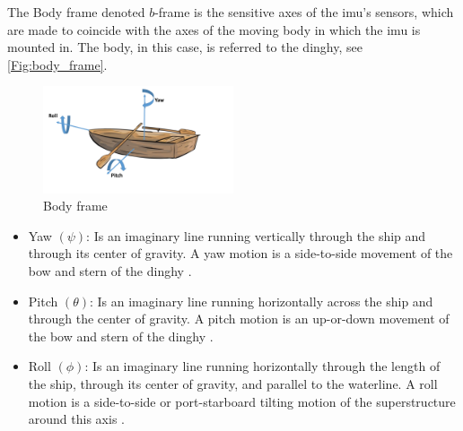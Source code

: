 The Body frame denoted $b$-frame is the sensitive axes of the \gls{imu}'s sensors, which are made to coincide with the axes of the moving body in which the \gls{imu} is mounted in. The body, in this case, is referred to the dinghy, see \autoref{Fig:body_frame}.

\begin{figure}[H]
\centering
\includegraphics[width=0.5\textwidth]{Figures/Euler_angle.pdf}
\caption{Body frame}
\label{Fig:body_frame}
\end{figure}
\begin{itemize}
\item Yaw $(\psi)$: Is an imaginary line running vertically through the ship and through its center of gravity. A yaw motion is a side-to-side movement of the bow and stern of the dinghy \cite{SNAME}.
\item Pitch $(\theta)$: Is an imaginary line running horizontally across the ship and through the center of gravity. A pitch motion is an up-or-down movement of the bow and stern of the dinghy \cite{SNAME}.
\item Roll $(\phi)$: Is an imaginary line running horizontally through the length of the ship, through its center of gravity, and parallel to the waterline. A roll motion is a side-to-side or port-starboard tilting motion of the superstructure around this axis \cite{SNAME}.
\end{itemize}

